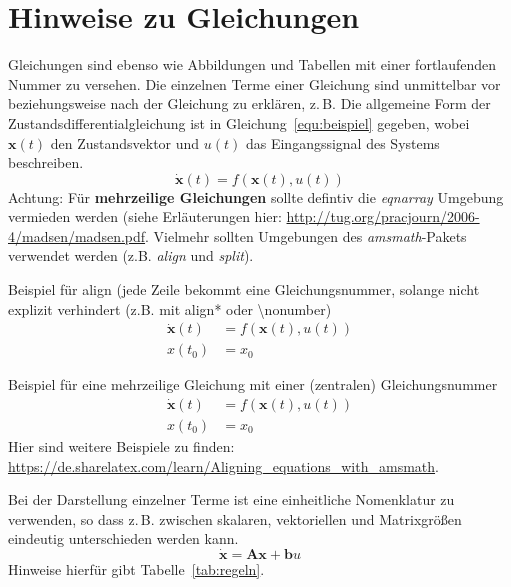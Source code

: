 \section{Hinweise zu Gleichungen}
\label{hinweise:gleichungen}
%
Gleichungen sind ebenso wie Abbildungen und Tabellen mit einer
fortlaufenden Nummer zu versehen. Die einzelnen Terme einer
Gleichung sind unmittelbar vor beziehungsweise nach der Gleichung
zu erklären, z.\,B. \glqq Die allgemeine Form der
Zustandsdifferentialgleichung ist in Gleichung~\ref{equ:beispiel} gegeben,
wobei $\mathbf{x}(t)$ den Zustandsvektor und $u(t)$ das
Eingangssignal des Systems beschreiben.\grqq
%
\begin{equation}
  \dot{\mathbf{x}}(t) = f(\mathbf{x}(t), u(t))
  \label{equ:beispiel}
\end{equation}
%
Achtung: Für \textbf{mehrzeilige Gleichungen} sollte defintiv die \textit{eqnarray} Umgebung
vermieden werden (siehe Erläuterungen hier: \url{http://tug.org/pracjourn/2006-4/madsen/madsen.pdf}.
Vielmehr sollten Umgebungen des \textit{amsmath}-Pakets verwendet werden (z.B. \textit{align} und \textit{split}).

Beispiel für align (jede Zeile bekommt eine Gleichungsnummer, solange nicht explizit verhindert (z.B. mit align* oder \textbackslash nonumber)
\begin{align}
    \dot{\mathbf{x}}(t) &= f(\mathbf{x}(t), u(t)) \\
    x(t_0) &= x_0
\end{align}

Beispiel für eine mehrzeilige Gleichung mit einer (zentralen) Gleichungsnummer
\begin{equation}
\begin{split}
    \dot{\mathbf{x}}(t) &= f(\mathbf{x}(t), u(t)) \\
    x(t_0) &= x_0
\end{split}
\end{equation}
Hier sind weitere Beispiele zu finden: \sloppy\url{https://de.sharelatex.com/learn/Aligning_equations_with_amsmath}.


%
Bei der Darstellung einzelner Terme ist eine einheitliche
Nomenklatur zu verwenden, so dass z.\,B. zwischen skalaren,
vektoriellen und Matrixgrößen eindeutig unterschieden werden kann.
%
\begin{equation}
  \dot{\mathbf{x}} = \mathbf{A} \mathbf{x} + \mathbf{b} u
  \label{equ:beispiel2}
\end{equation}
%
Hinweise hierfür gibt Tabelle~\ref{tab:regeln}.

